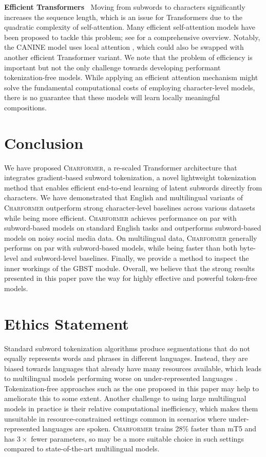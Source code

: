 \documentclass{article} \usepackage{iclr2022_conference,times}
\newcommand{\charformer}{\textsc{Charformer}\xspace}
\begin{document}
\noindent \textbf{Efficient Transformers} $\:$
Moving from subwords to characters significantly increases the sequence length, which is an issue for Transformers due to the quadratic complexity of self-attention. Many efficient self-attention models have been proposed \citep{choromanski2020rethinking,wang2020linformer,zaheer2020big} to tackle this problem; see \citep{tay2020efficient,tay2020long} for a comprehensive overview. Notably, the CANINE model uses local attention \citep{parmar2018image}, which could also be swapped with another efficient Transformer variant. We note that the problem of efficiency is important but not the only challenge towards developing performant tokenization-free models. While applying an efficient attention mechanism might solve the fundamental computational costs of employing character-level models, there is no guarantee that these models will learn locally meaningful compositions.

\section{Conclusion}

We have proposed \charformer, a re-scaled Transformer architecture that integrates gradient-based subword tokenization, a novel lightweight tokenization method that enables efficient end-to-end learning of latent subwords directly from characters. We have demonstrated that English and multilingual variants of \charformer outperform strong character-level baselines across various datasets while being more efficient. \charformer achieves performance on par with subword-based models on standard English tasks and outperforms subword-based models on noisy social media data. On multilingual data, \charformer generally performs on par with subword-based models, while being faster than both byte-level and subword-level baselines. Finally, we provide a method to inspect the inner workings of the GBST module. Overall, we believe that the strong results presented in this paper pave the way for highly effective and powerful token-free models.

\section*{Ethics Statement}



Standard subword tokenization algorithms produce segmentations that do not equally represents words and phrases in different languages. Instead, they are biased towards languages that already have many resources available, which leads to multilingual models performing worse on under-represented languages \citep{Wang2021multi-view}. Tokenization-free approaches such as the one proposed in this paper may help to ameliorate this to some extent. Another challenge to using large multilingual models in practice is their relative computational inefficiency, which makes them unsuitable in resource-constrained settings common in scenarios where under-represented languages are spoken. \charformer trains 28\% faster than mT5 and has $3\times$ fewer parameters, so may be a more suitable choice in such settings compared to state-of-the-art multilingual models.
\end{document}
